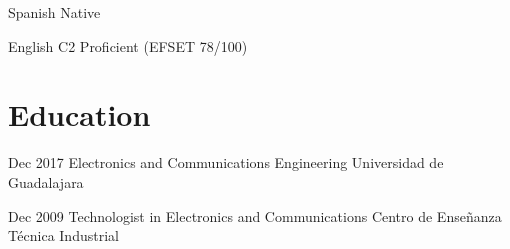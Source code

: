 \documentclass{resume} %
\begin{document}
\langitem
    {Spanish}
    {Native}


\langitem
    {English}
    {C2 Proficient (EFSET 78/100)}




\section{Education}


\eduitem
    {Dec 2017}
    {Electronics and Communications Engineering}
    {Universidad de Guadalajara}


\eduitem
    {Dec 2009}
    {Technologist in Electronics and Communications}
    {Centro de Enseñanza Técnica Industrial}


\end{document}
